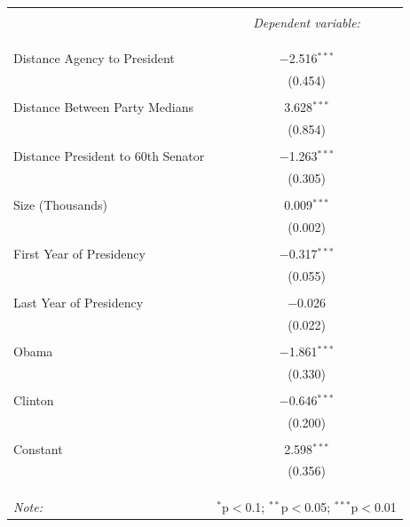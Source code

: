 \documentclass[12pt]{article}
\begin{document}
\newpage
\begin{table}[!htbp] \centering 
  \caption{} 
  \label{} 
\begin{tabular}{@{\extracolsep{5pt}}lc} 
\\[-1.8ex]\hline 
\hline \\[-1.8ex] 
 & \multicolumn{1}{c}{\textit{Dependent variable:}} \\ 
\cline{2-2} 
\\[-1.8ex] &   \\ 
\hline \\[-1.8ex] 
 Distance Agency to President & $-$2.516$^{***}$ \\ 
  & (0.454) \\ 
  & \\ 
 Distance Between Party Medians & 3.628$^{***}$ \\ 
  & (0.854) \\ 
  & \\ 
 Distance President to 60th Senator & $-$1.263$^{***}$ \\ 
  & (0.305) \\ 
  & \\ 
 Size (Thousands) & 0.009$^{***}$ \\ 
  & (0.002) \\ 
  & \\ 
 First Year of Presidency & $-$0.317$^{***}$ \\ 
  & (0.055) \\ 
  & \\ 
 Last Year of Presidency & $-$0.026 \\ 
  & (0.022) \\ 
  & \\ 
 Obama & $-$1.861$^{***}$ \\ 
  & (0.330) \\ 
  & \\ 
 Clinton & $-$0.646$^{***}$ \\ 
  & (0.200) \\ 
  & \\ 
 Constant & 2.598$^{***}$ \\ 
  & (0.356) \\ 
  & \\ 
\hline \\[-1.8ex] 
\hline 
\hline \\[-1.8ex] 
\textit{Note:}  & \multicolumn{1}{r}{$^{*}$p$<$0.1; $^{**}$p$<$0.05; $^{***}$p$<$0.01} \\ 
\end{tabular} 
\end{table} 
\end{document}
